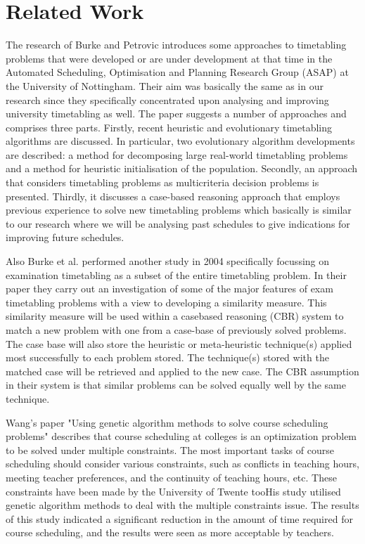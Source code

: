 \section{Related Work}
The research of Burke and Petrovic \cite{recentResearchDirectionsInAutomatedTimetabling} introduces some approaches to timetabling problems that were developed or are under development at that time in the Automated Scheduling, Optimisation and Planning Research Group (ASAP) at the University of Nottingham. Their aim was basically the same as in our research since they specifically concentrated upon analysing and improving university timetabling as well. The paper suggests a number of approaches and comprises three parts. Firstly, recent heuristic and evolutionary timetabling algorithms are discussed. In particular, two evolutionary algorithm developments are described: a method for decomposing large real-world timetabling problems and a method for heuristic initialisation of the population. Secondly, an approach that considers timetabling problems as multicriteria decision problems is presented. Thirdly, it discusses a case-based reasoning approach that employs previous experience to solve new timetabling problems which basically is similar to our research where we will be analysing past schedules to give indications for improving future schedules.

Also Burke et al. performed another study in 2004 \cite{burke2004analysing} specifically focussing on examination timetabling as a subset of the entire timetabling problem. In their paper they carry out an investigation of some of the major features of exam timetabling problems with a view to developing
a similarity measure. This similarity measure will be used within a casebased reasoning (CBR) system to match a new problem with one from a case-base of previously solved problems. The case base will also store the heuristic or meta-heuristic technique(s) applied most successfully to each problem stored. The technique(s) stored with the matched case will be retrieved and applied to the new case. The CBR assumption in their system is that similar problems can be solved equally well by the same technique.

Wang's paper "Using genetic algorithm methods to solve course scheduling problems" \cite{usingGeneticAlgorithmMethodsToSolveScheduling} describes that course scheduling at colleges is an optimization problem to be solved under multiple constraints. The most important tasks of course scheduling should consider various constraints, such as conflicts in teaching hours, meeting teacher preferences, and the continuity of teaching hours, etc. These constraints have been made by the University of Twente tooHis study utilised genetic algorithm methods to deal with the multiple constraints issue. The results of this study indicated a significant reduction in the amount of time required for course scheduling, and the results were seen as more acceptable by teachers.

